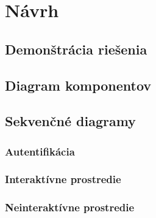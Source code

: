 \chapter{Návrh}\label{ch:návrh}

\section{Demonštrácia riešenia}\label{sec:demonstracia-riesenia}

\section{Diagram komponentov}\label{sec:diagram-komponentov}

\section{Sekvenčné diagramy}\label{sec:sekvencne-diagramy}

\subsection{Autentifikácia}\label{subsec:sek-autentifikacia}

\subsection{Interaktívne prostredie}\label{subsec:interkativne-prostredie}

\subsection{Neinteraktívne prostredie}\label{subsec:neinterkativne-prostredie}
